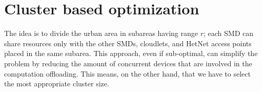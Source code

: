 \documentclass[twoside,openright]{report}
\begin{document}




\section{Cluster based optimization}
\label{sec:optimization}
The idea is to divide the urban area in subareas having range $r$; each \gls{SMD} can share resources only with the other \glspl{SMD}, cloudlets, and \gls{HetNet} access points placed in the same subarea. This approach, even if sub-optimal, can simplify the problem by reducing the amount of concurrent devices that are involved in the computation offloading. This means, on the other hand, that we have to select the most appropriate cluster size. 
\end{document}
